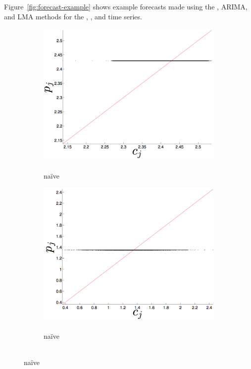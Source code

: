 Figure~\ref{fig:forecast-example} shows example forecasts made using
the \naive, ARIMA, and LMA methods for the \col, \gcc, and \svdfive
time series.
\begin{figure}[htbp]
  \centering
      \begin{subfigure}{0.6\columnwidth}
    \includegraphics[width=\columnwidth]{figs/colMeanForecast.png}
    \caption{\col\\ na\"ive }
    \label{fig:gccMEAN}
  \end{subfigure}%
   \begin{subfigure}{0.6\columnwidth}
    \includegraphics[width=\columnwidth]{figs/gccMeanForecast.png}
    \caption{\gcc\\ na\"ive }

\end{subfigure}
\end{figure}
